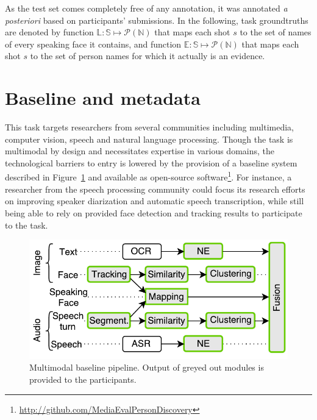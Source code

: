 \documentclass{acm_proc_article-me}
\newcommand\refEvidences{\mathbb{E}}
\newcommand\refLabels{\mathbb{L}}
\newcommand\refNames{\mathbb{N}}
\newcommand\shots{\mathbb{S}}
\begin{document}
As the test set comes completely free of any annotation, it was annotated \emph{a posteriori} based on participants' submissions. In the following, task groundtruths are denoted by function $\refLabels : \shots \mapsto \mathcal{P}(\refNames)$ that maps each shot $s$ to the set of names of every speaking face it contains, and function $\refEvidences : \shots \mapsto \mathcal{P}(\refNames)$ that maps each shot $s$ to the set of person names for which it actually is an evidence.

\section{Baseline and metadata}

This task targets researchers from several communities including multimedia, computer vision, speech and natural language processing. Though the task is multimodal by design and necessitates expertise in various domains, the technological barriers to entry is lowered by the provision of a baseline system described in Figure~\ref{fig:baseline} and available as open-source software\footnote{\url{http://github.com/MediaEvalPersonDiscovery}}.
For instance, a researcher from the speech processing community could focus its research efforts on improving speaker diarization and automatic speech transcription, while still being able to rely on provided face detection and tracking results to participate to the task.

\begin{figure}[htb]
 \centering
 \includegraphics[width=1\linewidth]{figs/baseline.pdf}
 \vspace{-0.6cm}
 \caption{Multimodal baseline pipeline. Output of greyed out modules is provided to the participants.}
 \label{fig:baseline}
\end{figure}
\end{document}

